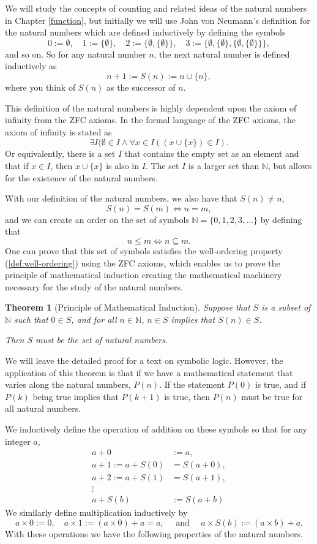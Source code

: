 \documentclass[
]{book}
\newtheorem{theorem}{Theorem}[chapter]
\theoremstyle{definition}
\theoremstyle{definition}
\theoremstyle{definition}
\theoremstyle{definition}
\theoremstyle{remark}
\begin{document}
We will study the concepts of counting and related ideas of the natural numbers in Chapter \ref{function}, but initially we will use John von Neumann's \citeyearpar{vonNeumann23} definition for the natural numbers which are defined inductively by defining the symbols
\[0:=\emptyset, \quad 1:=\{\emptyset\}, \quad 2:=\{\emptyset, \{\emptyset\}\}, \quad 3:=\{\emptyset, \{\emptyset\}, \{\emptyset, \{\emptyset\} \}\},\] and so on. So for any natural number \(n\), the next natural number is defined inductively as \[n+1:=S(n) := n\cup \{n\},\] where you think of \(S(n)\) as the successor of \(n\).

This definition of the natural numbers is highly dependent upon the axiom of infinity from the ZFC axioms. In the formal language of the ZFC axioms, the axiom of infinity is stated as
\[\exists I ( \emptyset\in I \wedge \forall x\in I((x\cup \{x\})\in I).\] Or equivalently, there is a set \(I\) that contains the empty set as an element and that if \(x\in I\), then \(x\cup \{x\}\) is also in \(I\). The set \(I\) is a larger set than \(\mathbb{N}\), but allows for the existence of the natural numbers.

With our definition of the natural numbers, we also have that \(S(n)\neq n\), \[S(n)=S(m) \Leftrightarrow n=m,\] and we can create an order on the set of symbols \(\mathbb{N} = \{0, 1, 2, 3, \ldots \}\) by defining that
\[n \leq m \Longleftrightarrow n \subseteq m.\] One can prove that this set of symbols satisfies the well-ordering property (\ref{def:well-ordering}) using the ZFC axioms, which enables us to prove the principle of mathematical induction creating the mathematical machinery necessary for the study of the natural numbers.

\begin{theorem}[Principle of Mathematical Induction]
Suppose that \(S\) is a subset of \(\mathbb{N}\) such that \(0\in S\), and for all \(n\in \mathbb{N}\), \(n\in S\) implies that \(S(n) \in S\).

Then \(S\) must be the set of natural numbers.
\end{theorem}

We will leave the detailed proof for a text on symbolic logic. However, the application of this theorem is that if we have a mathematical statement that varies along the natural numbers, \(P(n)\). If the statement \(P(0)\) is true, and if \(P(k)\) being true implies that \(P(k+1)\) is true, then \(P(n)\) must be true for all natural numbers.

We inductively define the operation of addition on these symbols so that for any integer \(a\),
\begin{align*}
    a+0 &:=a, \\
    a+1 := a+S(0) &= S(a+0), \\
    a+2:=a+S(1) &= S(a+1), \\
    \vdots \\
    a+S(b) &:= S(a+b)
\end{align*}
We similarly define multiplication inductively by
\[a\times 0 := 0, \quad a\times 1 := (a \times 0)+a = a, \quad \mbox{ and } \quad a\times S(b) := (a\times b)+a.\]
With these operations we have the following properties of the natural numbers.
\end{document}
